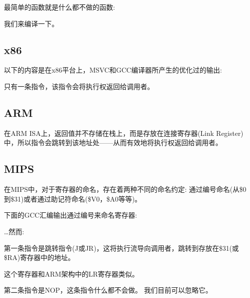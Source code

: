 \label{empty_func}

最简单的函数就是什么都不做的函数:



我们来编译一下。

\subsection{x86}

以下的内容是在x86平台上，MSVC和GCC编译器所产生的优化过的输出:



只有一条指令\RET，该指令会将执行权返回给\gls{调用者}。

\subsection{ARM}



在ARM \ac{ISA}上，返回值并不存储在栈上，而是存放在连接寄存器(Link Register)中，所以指令会跳转到该地址处——从而有效地将执行权返回给\gls{调用者}。

\subsection{MIPS}

在MIPS中，对于寄存器的命名，存在着两种不同的命名约定: 通过编号命名(从\$0到\$31)或者通过助记符命名(\$V0，\$A0等等)。

下面的GCC汇编输出通过编号来命名寄存器:



\dots 然而:



第一条指令是跳转指令(J或JR)，这将执行流导向\gls{调用者}，跳转到存放在\$31(或\$RA)寄存器中的地址。

这个寄存器和ARM架构中的\ac{LR}寄存器类似。

第二条指令是\ac{NOP}，这条指令什么都不会做。
我们目前可以忽略它。


